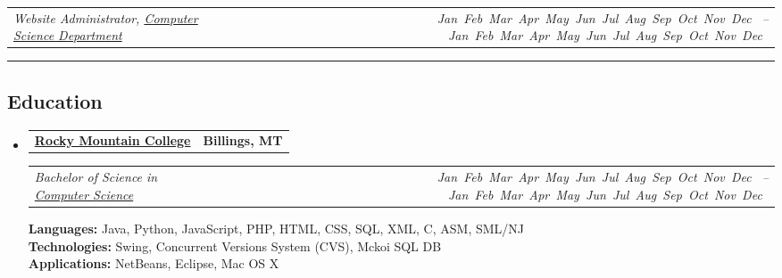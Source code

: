 \documentclass[9pt,letterpaper]{extarticle}
\makeatletter
\newcommand{\headerrow}[2]
{\begin{tabular*}{\linewidth}{l@{\extracolsep{\fill}}r}
	#1 &
	#2 \\
\end{tabular*}}
\newcommand{\DatestampYM}[2]{\mbox{\ShortMonth{#2}#1}}
\newcommand{\ShortMonth}[1]{
\ifcase#1\relax
\or Jan
\or Feb
\or Mar
\or Apr
\or May
\or Jun
\or Jul
\or Aug
\or Sep
\or Oct
\or Nov
\or Dec
\fi}
\makeatother
\begin{document}
\begin{itemize}
	\headerrow
		{\emph{Website Administrator, \href{http://cs.rocky.edu/programming-competitions/high-school-competions/}{Computer Science Department}}}
		{\emph{\DatestampYM{2010}{09} --\DatestampYM{2011}{05}}}
\end{itemize}


\hrule
\vspace{-0.2em}
\subsection*{Education}

\begin{itemize}
	\parskip=0.1em

	\item
	\headerrow
		{\textbf{\href{http://www.rocky.edu/}{Rocky Mountain College}}}
		{\textbf{Billings, MT}}
	\headerrow
		{\emph{Bachelor of Science in \href{http://cs.rocky.edu/}{Computer Science}}}
		{\emph{\DatestampYM{2010}{08} --\DatestampYM{2014}{05}}}
	\textbf{Languages:} Java, Python, JavaScript, PHP, HTML, CSS, SQL, XML, C, ASM, SML/NJ
	\\\textbf{Technologies:} Swing, Concurrent Versions System (CVS), Mckoi SQL DB
	\\\textbf{Applications:} NetBeans, Eclipse, Mac OS X
\end{itemize}
\end{document}
